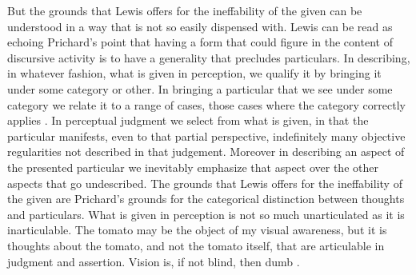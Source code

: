 \documentclass[12pt]{article}
\begin{document}
But the grounds that Lewis offers for the ineffability of the given can be understood in a way that is not so easily dispensed with. Lewis can be read as echoing Prichard's \citeyearpar[44]{Prichard:1909yg} point that having a form that could figure in the content of discursive activity is to have a generality that precludes particulars. In describing, in whatever fashion, what is given in perception, we qualify it by bringing it under some category or other. In bringing a particular that we see under some category we relate it to a range of cases, those cases where the category correctly applies \citep[see][]{Travis:2005ys,Travis:2008uq}. In perceptual judgment we select from what is given, in that the particular manifests, even to that partial perspective, indefinitely many objective regularities not described in that judgement. Moreover in describing an aspect of the presented particular we inevitably emphasize that aspect over the other aspects that go undescribed. The grounds that Lewis offers for the ineffability of the given are Prichard's grounds for the categorical distinction between thoughts and particulars. What is given in perception is not so much unarticulated as it is inarticulable. The tomato may be the object of my visual awareness, but it is thoughts about the tomato, and not the tomato itself, that are articulable in judgment and assertion. Vision is, if not blind, then dumb \citep[see][]{Austin:1962lr,Travis:2004kx}.

\end{document}
